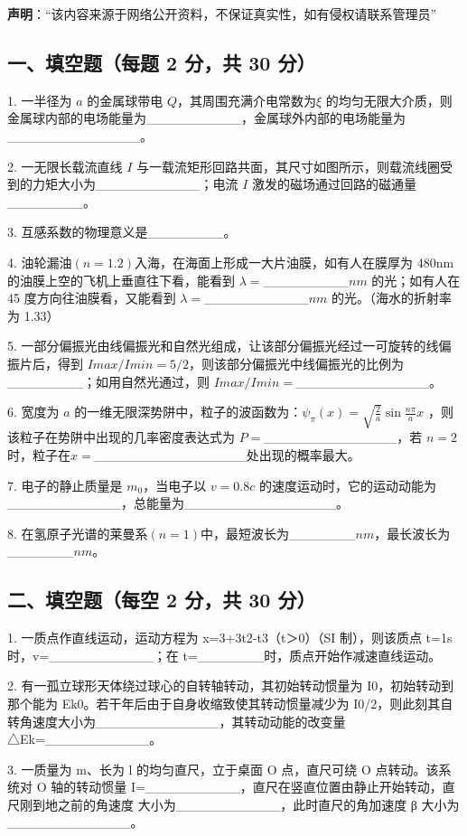 
\textbf{声明}：“该内容来源于网络公开资料，不保证真实性，如有侵权请联系管理员”

\subsection{一、填空题（每题 2 分，共 30 分）}
1. 一半径为 $a$ 的金属球带电 $Q$，其周围充满介电常数为$\xi$ 的均匀无限大介质，则金属球内部的电场能量为__________，金属球外内部的电场能量为______________。

2. 一无限长载流直线 $I$ 与一载流矩形回路共面，其尺寸如图所示，则载流线圈受到的力矩大小为___________；电流 $I$ 激发的磁场通过回路的磁通量________。

3. 互感系数的物理意义是________。

4. 油轮漏油$(n=1.2)$入海，在海面上形成一大片油膜，如有人在膜厚为 480nm的油膜上空的飞机上垂直往下看，能看到 $\lambda=$_________$nm$ 的光；如有人在 45 度方向往油膜看，又能看到 $\lambda=$___________$nm$ 的光。（海水的折射率为 1.33）

5. 一部分偏振光由线偏振光和自然光组成，让该部分偏振光经过一可旋转的线偏振片后，得到 $Imax/Imin=5/2$，则该部分偏振光中线偏振光的比例为________；如用自然光通过，则 $Imax/Imin=$______________。

6. 宽度为 $a$ 的一维无限深势阱中，粒子的波函数为：$\psi_\pi(x)=\sqrt{\frac{2}{a}}\sin\frac{n \pi}{a}x$ ，则该粒子在势阱中出现的几率密度表达式为 $P=$______________，若 $n=2$ 时，粒子在$x=$________________处出现的概率最大。

7. 电子的静止质量是 $m_0$，当电子以 $v=0.8c$ 的速度运动时，它的运动动能为____________，总能量为________________。

8. 在氢原子光谱的莱曼系$(n=1)$中，最短波长为_______$nm$，最长波长为_______$nm$。
\subsection{二、填空题（每空 2 分，共 30 分）}
1. 一质点作直线运动，运动方程为 x=3+3t2-t3（t＞0）（SI 制），则该质点 t=1s
时，v=___________；在 t=_______时，质点开始作减速直线运动。

2. 有一孤立球形天体绕过球心的自转轴转动，其初始转动惯量为 I0，初始转动到那个能为 Ek0。若干年后由于自身收缩致使其转动惯量减少为 I0/2，则此刻其自转角速度大小为_____________，其转动动能的改变量△Ek=___________。

3. 一质量为 m、长为 l 的均匀直尺，立于桌面 O 点，直尺可绕 O 点转动。该系统对 O 轴的转动惯量 I=__________，直尺在竖直位置由静止开始转动，直尺刚到地之前的角速度 大小为___________，此时直尺的角加速度 β 大小为_____________。

